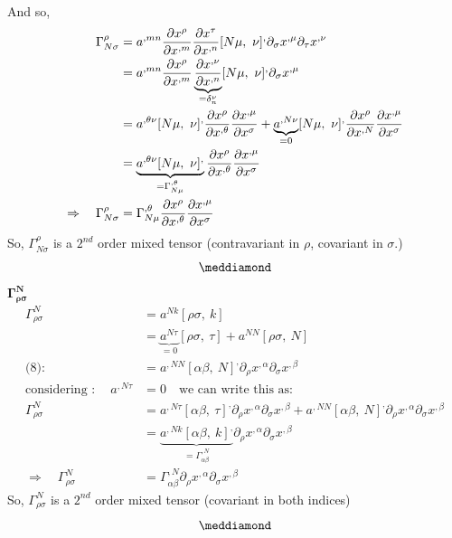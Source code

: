 And so,
\begin{align}
 \Gamma^{\rho}_{N \sigma} &=a^{,mn}\pdv{x^{\rho}}{x^{,m}}\pdv{x^{\tau}}{x^{,n}}[ N \mu, \ \nu]^{,}\partial_{\sigma}x^{,\mu}\partial_{\tau}x^{,\nu}\\
\ &=a^{,mn}\pdv{x^{\rho}}{x^{,m}}\underbrace{\pdv{x^{,\nu}}{x^{,n}}}_{= \delta^{\nu}_{n}}[ N \mu, \ \nu]^{,}\partial_{\sigma}x^{,\mu}\\
\ &=a^{,\theta \nu }[ N \mu, \ \nu]^{,}\pdv{x^{\rho}}{x^{,\theta}}\pdv{x^{,\mu}}{x^{\sigma}}+ \underbrace{a^{,N \nu }}_{=0}[ N \mu, \ \nu]^{,}\pdv{x^{\rho}}{x^{,N}}\pdv{x^{,\mu}}{x^{\sigma}}\\
\ &=\underbrace{a^{,\theta \nu }[ N \mu, \ \nu]^{,}}_{ = \Gamma^{,\theta}_{N\mu}}\pdv{x^{\rho}}{x^{,\theta}}\pdv{x^{,\mu}}{x^{\sigma}}\\
\Rightarrow \quad \Gamma^{\rho}_{N \sigma} &=  \Gamma^{,\theta}_{N\mu}\pdv{x^{\rho}}{x^{,\theta}}\pdv{x^{,\mu}}{x^{\sigma}}
\end{align}
So, $\Gamma^{\rho}_{N \sigma}$ is a $2^{nd}$ order mixed tensor (contravariant in $\rho$, covariant in $\sigma$.)
$$\meddiamond$$
$\boldsymbol{\Gamma^{N }_{\rho \sigma}}$\\
\begin{align}
\Gamma^{N }_{\rho \sigma} &= a^{N  k}[\rho \sigma,\ k]\\
\ & = \underbrace{a^{N \tau}}_{=0}[\rho \sigma,\ \tau]+ a^{N N}[\rho \sigma,\ N]\\
\text{(8):}\quad &= a^{,NN}[\alpha \beta, \ N]^{,}\partial_{\rho}x^{,\alpha}\partial_{\sigma}x^{,\beta}\\
\text{considering :}\quad \ a^{,N \tau} & =0 \quad \text{we can write this as:}\\
\Gamma^{N }_{\rho \sigma} &=a^{,N \tau}[\alpha \beta, \ \tau]^{,}\partial_{\rho}x^{,\alpha}\partial_{\sigma}x^{,\beta}+ a^{,NN}[\alpha \beta, \ N]^{,}\partial_{\rho}x^{,\alpha}\partial_{\sigma}x^{,\beta}\\
\ &=\underbrace{a^{,N k}[\alpha \beta, \ k]^{,}}_{= \Gamma^{,N}_{\alpha \beta}}\partial_{\rho}x^{,\alpha}\partial_{\sigma}x^{,\beta}\\
\Rightarrow \quad \Gamma^{N }_{\rho \sigma} &= \Gamma^{,N}_{\alpha \beta}\partial_{\rho}x^{,\alpha}\partial_{\sigma}x^{,\beta}
\end{align}
So, $\Gamma^{N }_{\rho \sigma}$ is a $2^{nd}$ order mixed tensor (covariant in both indices)
$$\meddiamond$$

